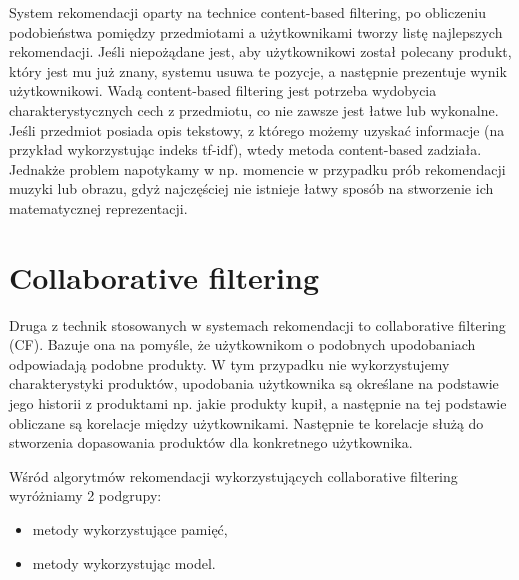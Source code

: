System rekomendacji oparty na technice content-based filtering, po obliczeniu podobieństwa pomiędzy przedmiotami a użytkownikami tworzy listę najlepszych rekomendacji. Jeśli niepożądane jest, aby użytkownikowi został polecany produkt, który jest mu już znany, systemu usuwa te pozycje, a następnie prezentuje wynik użytkownikowi. Wadą content-based filtering jest potrzeba wydobycia charakterystycznych cech z przedmiotu, co nie zawsze jest łatwe lub wykonalne. Jeśli przedmiot posiada opis tekstowy, z którego możemy uzyskać informacje
(na przykład wykorzystując indeks tf-idf), wtedy metoda content-based zadziała. Jednakże problem napotykamy w np. momencie w przypadku prób rekomendacji muzyki lub obrazu, gdyż najczęściej nie istnieje łatwy sposób na stworzenie ich matematycznej reprezentacji.

\section{Collaborative filtering}

Druga z technik stosowanych w systemach rekomendacji to collaborative filtering (CF). Bazuje ona na pomyśle, że użytkownikom o podobnych upodobaniach odpowiadają podobne produkty. W tym przypadku nie wykorzystujemy charakterystyki produktów, upodobania użytkownika są określane na podstawie jego historii z produktami np. jakie produkty kupił, a następnie na tej podstawie obliczane są korelacje między użytkownikami. Następnie te korelacje służą do stworzenia dopasowania produktów dla konkretnego użytkownika.

Wśród algorytmów rekomendacji wykorzystujących collaborative filtering wyróżniamy 2 podgrupy:
\begin{itemize}
    \item metody wykorzystujące pamięć,
    \item metody wykorzystując model.
\end{itemize}

